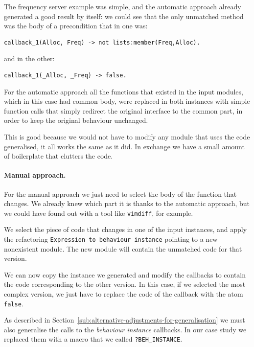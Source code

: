 The frequency server example was simple, and the automatic approach 
already generated a good result by itself: we could see that the only 
unmatched method was the body of a precondition that in one was:

\begin{verbatim}
callback_1(Alloc, Freq) -> not lists:member(Freq,Alloc).
\end{verbatim}

and in the other:

\begin{verbatim}
callback_1(_Alloc, _Freq) -> false.
\end{verbatim}


For the automatic approach all the functions that existed in the input modules, 
which in this case had common body, were replaced in both instances with simple 
function calls that simply redirect the original interface to the common part, 
in order to keep the original behaviour unchanged.

This is good because we would not have to modify any module that uses the code 
generalised, it all works the same as it did. In exchange we have a small 
amount of boilerplate that clutters the code.

\paragraph{Manual approach.}

For the manual approach we just need to select the body of the function that 
changes. We already knew which part it is thanks to the automatic approach, 
but we could have found out with a tool like \texttt{vimdiff}, for example.

We select the piece of code that changes in one of the input instances, and 
apply the refactoring \texttt{Expression to behaviour instance} pointing to a 
new nonexistent module. The new module will contain the unmatched code for that 
version.

We can now copy the instance we generated and modify the callbacks to contain 
the code corresponding to the other version. In this case, if we selected the 
most complex version, we just have to replace the code of the callback with the 
atom \texttt{false}.

As described in Section~\ref{sub:alternative-adjustments-for-generalisation} we 
must also generalise the calls to the \emph{behaviour instance} callbacks. In 
our case study we replaced them with a macro that we called 
\texttt{?BEH\_INSTANCE}.

